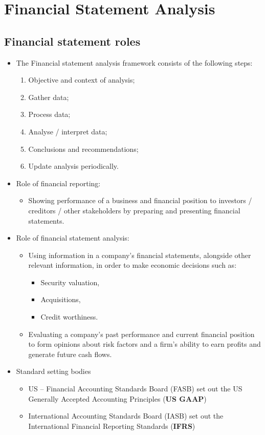 \documentclass[../notes_compiled.tex]{subfiles}
\begin{document}
\section{Financial Statement Analysis}
\subsection{Financial statement roles}
\begin{itemize}
\item The Financial statement analysis framework consists of the following steps:
\begin{enumerate}
\item Objective and context of analysis;
\item Gather data;
\item Process data;
\item Analyse / interpret data;
\item Conclusions and recommendations;
\item Update analysis periodically.
\end{enumerate}
\item Role of financial reporting:
\begin{itemize}
\item Showing performance of a business and financial position to investors / creditors / other stakeholders by preparing and presenting financial statements.
\end{itemize}
\item Role of financial statement analysis:
\begin{itemize}
\item Using information in a company's financial statements, alongside other relevant information, in order to make economic decisions such as:
\begin{itemize}
\item Security valuation,
\item Acquisitions,
\item Credit worthiness.
\end{itemize}
\item Evaluating a company's past performance and current financial position to form opinions about risk factors and a firm's ability to earn profits and generate future cash flows.
\end{itemize}
\item Standard setting bodies
\begin{itemize}
\item US -- Financial Accounting Standards Board (FASB) set out the US Generally Accepted Accounting Principles (\textbf{US GAAP})
\item International Accounting Standards Board (IASB) set out the International Financial Reporting Standards (\textbf{IFRS})
\end{itemize}
\end{itemize}
\end{document}
